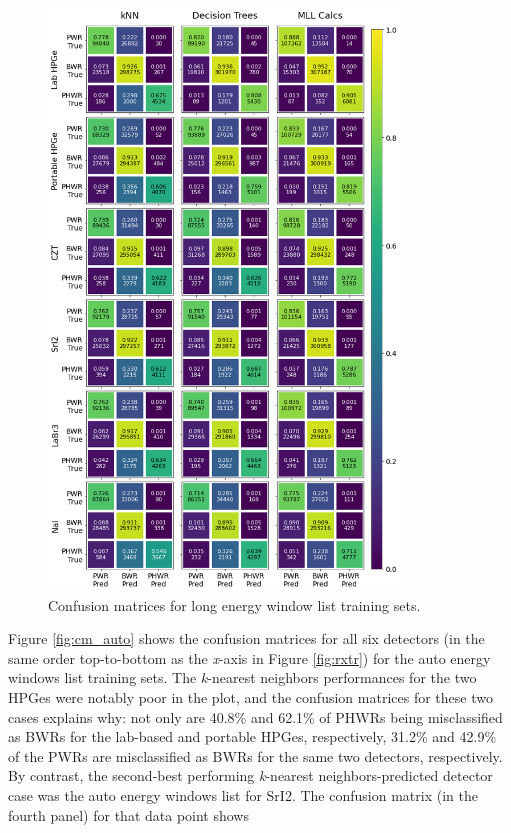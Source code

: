 \begin{figure}[H]
  \centering
  \includegraphics[width=0.83\textwidth]{./chapters/exp2/confusion_matrix_6dets_long.png}
  \caption{Confusion matrices for long energy window list training sets.}
  \label{fig:cm_long}
\end{figure}

Figure \ref{fig:cm_auto} shows the confusion matrices for all six detectors (in
the same order top-to-bottom as the \textit{x}-axis in Figure \ref{fig:rxtr})
for the auto energy windows list training sets. The \textit{k}-nearest
neighbors performances for the two \gls{HPGe}s were notably poor in the plot,
and the confusion matrices for these two cases explains why: not only are
40.8\% and 62.1\% of \gls{PHWR}s being misclassified as \gls{BWR}s for the
lab-based and portable \gls{HPGe}s, respectively, 31.2\% and 42.9\% of the
\gls{PWR}s are misclassified as \gls{BWR}s for the same two detectors,
respectively. By contrast, the second-best performing \textit{k}-nearest
neighbors-predicted detector case was the auto energy windows list for
\gls{SrI2}. The confusion matrix (in the fourth panel) for that data point 
shows 


